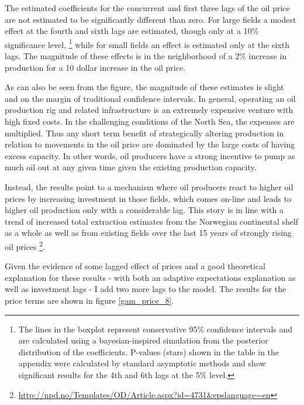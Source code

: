 \documentclass[12pt]{article}
\begin{document}
The estimated coefficients for the concurrent and first three lags of the oil price are not estimated to be significantly different than zero.  For large fields a modest effect at the fourth and sixth lags are estimated, though only at a 10\% significance level, \footnote{The lines in the boxplot represent conservative 95\% confidence intervals and are calculated using a bayesian-inspired simulation from the posterior distribution of the coefficients.  P-values (stars) shown in the table in the appendix were calculated by standard asymptotic methods and show significant results for the 4th and 6th lags at the 5\% level.} while for small fields an effect is estimated only at the sixth lags. The magnitude of these effects is in the neighborhood of a 2\% increase in production for a 10 dollar increase in the oil price.  

As can also be seen from the figure, the magnitude of these estimates is slight and on the margin of traditional confidence intervals.  In general, operating an oil production rig and related infrastructure is an extremely expensive venture with high fixed costs.  In the challenging conditions of the North Sea, the expenses are multiplied.  Thus any short term benefit of strategically altering production in relation to movements in the oil price are dominated by the large costs of having excess capacity.  In other words, oil producers have a strong incentive to pump as much oil out at any given time given the existing production capacity.  

Instead, the results point to a mechanism where oil producers react to higher oil prices by increasing investment in those fields, which comes on-line and leads to higher oil production only with a considerable lag.   This story is in line with a trend of increased total extraction estimates from the Norwegian continental shelf as a whole as well as from existing fields over the last 15 years of strongly rising oil prices \footnote{\url{http://npd.no/Templates/OD/Article.aspx?id=4731&epslanguage=en}}.

Given the evidence of some lagged effect of prices and a good theoretical explanation for these results - with both an adaptive expectations explanation as well as investment lags - I add two more lags to the model.  The results for the price terms are shown in figure \ref{gam_price_8}.
\end{document}
